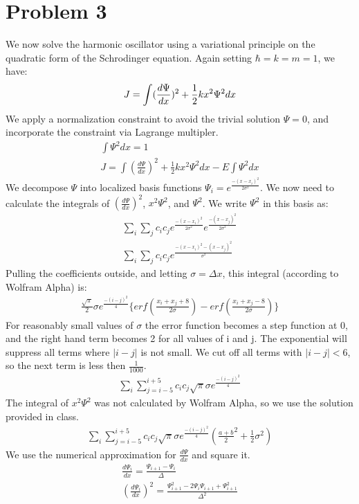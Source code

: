 \documentclass[a4paper,10pt]{article}
\numberwithin{equation}{section}
\begin{document}
\section{Problem 3}
We now solve the harmonic oscillator using a variational principle on the quadratic form of the Schrodinger equation.
Again setting $\hbar =k=m=1$, we have:
\begin{equation}
J=\int (\frac{d\Psi }{dx})^{2}+\frac{1}{2}kx^2\Psi ^2 dx\\
\end{equation}
We apply a normalization constraint to avoid the trivial solution $\Psi=0$, and incorporate the constraint via Lagrange multipler.
\begin{gather}
\int \Psi^2 dx = 1\\
J=\int (\frac{d\Psi }{dx})^{2}+\frac{1}{2}kx^2\Psi ^2 dx - E\int \Psi^2 dx
\end{gather}
We decompose $\Psi$ into localized basis functions $\Psi_i=e^{\frac{-(x-x_i)^2}{2\sigma ^2}}$.
We now need to calculate the integrals of $(\frac{d\Psi }{dx})^{2}$, $x^2\Psi ^2$, and $\Psi^2$.
We write $\Psi^2$ in this basis as:
\begin{gather}
 \sum_{i}\sum_{j}c_ic_je^{\frac{-(x-x_i)^2}{2\sigma ^2}}e^{\frac{-(x-x_j)^2}{2\sigma ^2}}\\
 \sum_{i}\sum_{j}c_ic_je^{\frac{-(x-x_i)^2-(x-x_j)^2}{\sigma ^2}}
\end{gather}
Pulling the coefficients outside, and letting $\sigma=\Delta x$, this integral (according to Wolfram Alpha) is:
\begin{gather}
\frac{\sqrt{\pi}}{2}\sigma e^{\frac{-(i-j)^2}{4}}\{erf(\frac{x_i+x_j+8}{2\sigma})-erf(\frac{x_i+x_j-8}{2\sigma})\}
\end{gather}
For reasonably small values of $\sigma$ the error function becomes a step function at 0, and the right hand term becomes 2 for all values of i and j.
The  exponential will suppress all terms where $|i-j|$ is not small. We cut off all terms with  $|i-j|<6$, so the next term is less then $\frac{1}{1000}$.
\begin{gather}
 \sum_{i}\sum_{j=i-5}^{i+5}c_ic_j\sqrt{\pi}\sigma e^{\frac{-(i-j)^2}{4}}
\end{gather}
The integral of $x^2\Psi ^2$ was not calculated by Wolfram Alpha, so we use the solution provided in class.
\begin{gather}
 \sum_{i}\sum_{j=i-5}^{i+5}c_ic_j\sqrt{\pi}\sigma e^{\frac{-(i-j)^2}{4}}(\frac{a+b}{2}^2+\frac{1}{2}\sigma ^2)
\end{gather}
We use the numerical approximation for $\frac{d\Psi}{dx}$ and square it.
\begin{gather}
 \frac{d \Psi_{i}}{dx}=\frac{\Psi_{i+1}-\Psi_{i}}{\Delta}\\
 (\frac{d \Psi_{i}}{dx})^2=\frac{\Psi_{i+1}^2-2\Psi_{i}\Psi_{i+1}+\Psi_{i+1}^2}{\Delta ^2}\\
\end{gather}
\end{document}
